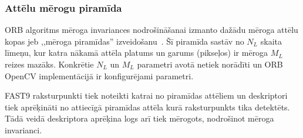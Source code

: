 \subsubsection{Attēlu mērogu piramīda} \label{sec:pyramid}
ORB algoritms mēroga invariances nodrošināšanai izmanto 
dažādu mēroga attēlu kopas jeb ,,mēroga piramīdas'' izveidošanu~\cite{ORB}.
Šī piramīda sastāv no $N_L$ skaita līmeņu, kur katra nākamā attēla platums
un garums (pikseļos) ir mēroga $M_L$ reizes mazāks. Konkrētie $N_L$ un $M_L$
parametri avotā \cite{ORB} netiek norādīti un
ORB OpenCV implementācijā\cite{OpenCV-src} ir konfigurējami parametri.

FAST9 raksturpunkti tiek noteikti katrai no piramīdas attēliem un deskriptori
tiek aprēķināti no attiecīgā piramīdas attēla kurā raksturpunkts tika
detektēts. Tādā veidā deskriptora aprēķina logs arī tiek mērogots,
nodrošinot mēroga invarianci.
